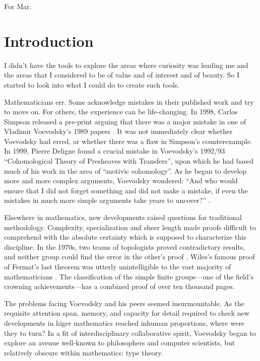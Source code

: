 \documentclass[12pt,twoside]{reedthesis}
\begin{document}
For Mar.

\mainmatter %
\pagestyle{fancyplain} %

\chapter*{Introduction}

\setlength{\epigraphwidth}{0.8\textwidth}
\epigraph{I didn’t have the tools to explore the areas where curiosity was
  leading me and the areas that I considered to be of value and of interest and
  of beauty. So I started to look into what I could do to create such tools.}{\cite{voevodsky-ias}}

Mathematicians err. Some acknowledge mistakes in their published work and
try to move on. For others, the experience can be life-changing. In 1998, Carlos
Simpson released a pre-print arguing that there was a major mistake in one of
Vladimir Voevodsky's 1989 papers \cite{voevodsky-presentation}. It was not
immediately clear whether Voevodsky had erred, or whether there was a flaw in
Simpson's counterexample. In 1999, Pierre Deligne found a crucial mistake in
Voevodsky's 1992/93 ``Cohomological Theory of Presheaves with Transfers'', upon
which he had based much of his work in the area of ``motivic cohomology''. As he
began to develop more and more complex arguments, Voevodsky wondered: ``And who
would ensure that I did not forget something and did not make a mistake, if even
the mistakes in much more simple arguments take years to uncover?''
\cite{voevodsky-ias}.

Elsewhere in mathematics, new developments raised questions for traditional
methodology. Complexity, specialization and sheer length made
proofs difficult to comprehend with the absolute certainty which is
supposed to characterize this discipline. In the 1970s, two teams of
topologists proved contradictory results, and neither group could find the error
in the other's proof \cite{kolata}. Wiles's famous proof of Fermat's last
theorem was utterly unintelligible to the vast majority of mathematicians
\cite{nyt}. The classification of the simple finite groups---one of the field's
crowning achievements---has a combined proof of over ten thousand pages.

The problems facing Voevodsky and his peers seemed insurmountable.
As the requisite attention span, memory, and capacity for detail required to
check new developments in higer mathematics reached inhuman proportions,
where were they to turn? In a fit of interdisciplinary collaborative spirit,
Voevodsky began to explore an avenue well-known to philosophers and computer
scientists, but relatively obscure within mathematics: type theory.
\end{document}
